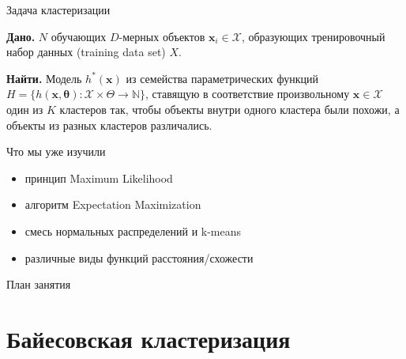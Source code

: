 \documentclass[10pt]{beamer}
\begin{document}
\begin{frame}{Задача кластеризации}

{\bf Дано.} $N$ обучающих $D$-мерных объектов $\mathbf{x}_i \in \mathcal{X}$, образующих тренировочный набор данных (training data set) $X$.

\vspace{1em}
{\bf Найти.} Модель $h^*(\mathbf{x})$ из семейства параметрических функций $H = \{h(\mathbf{x, \mathbf{\theta}}): \mathcal{X} \times \Theta \rightarrow \mathbb{N}\}$, ставящую в соответствие произвольному $\mathbf{x} \in \mathcal{X}$ один из $K$ кластеров так, чтобы объекты внутри одного кластера были похожи, а объекты из разных кластеров различались.

\vspace{1em}
Что мы уже изучили
\begin{itemize}
\item принцип Maximum Likelihood
\item алгоритм Expectation Maximization
\item смесь нормальных распределений и k-means
\item различные виды функций расстояния/схожести
\end{itemize}

\end{frame}

\begin{frame}{План занятия}
\tableofcontents
\end{frame}


\section{Байесовская кластеризация}

\end{document}
